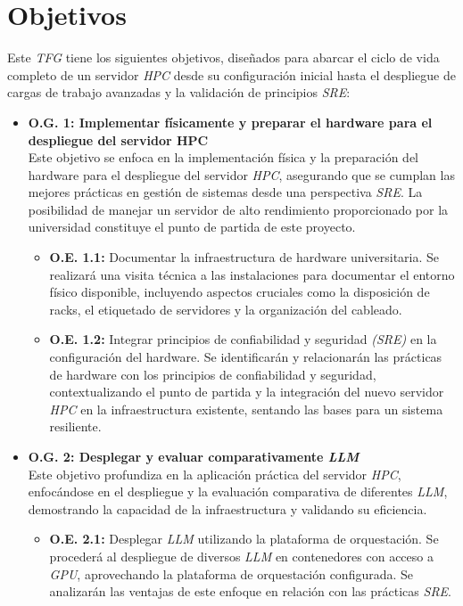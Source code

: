 \section{Objetivos}
Este \textit{TFG} tiene los siguientes objetivos, diseñados para abarcar el ciclo de vida completo de un servidor \textit{HPC} desde su configuración inicial hasta el despliegue de cargas de trabajo avanzadas y la validación de principios \textit{SRE}:

\begin{itemize}
    \item \textbf{O.G. 1: Implementar físicamente y preparar el hardware para el despliegue del servidor HPC}\\
    Este objetivo se enfoca en la implementación física y la preparación del hardware para el despliegue del servidor \textit{HPC}, asegurando que se cumplan las mejores prácticas en gestión de sistemas desde una perspectiva \textit{SRE}. La posibilidad de manejar un servidor de alto rendimiento proporcionado por la universidad constituye el punto de partida de este proyecto.
    \begin{itemize}
        \item \textbf{O.E. 1.1:} Documentar la infraestructura de hardware universitaria. Se realizará una visita técnica a las instalaciones para documentar el entorno físico disponible, incluyendo aspectos cruciales como la disposición de racks, el etiquetado de servidores y la organización del cableado.
        \item \textbf{O.E. 1.2:} Integrar principios de confiabilidad y seguridad \textit{(SRE)} en la configuración del hardware. Se identificarán y relacionarán las prácticas de hardware con los principios de confiabilidad y seguridad, contextualizando el punto de partida y la integración del nuevo servidor \textit{HPC} en la infraestructura existente, sentando las bases para un sistema resiliente.
    \end{itemize}
    \item \textbf{O.G. 2: Desplegar y evaluar comparativamente \textit{LLM}}\\
    Este objetivo profundiza en la aplicación práctica del servidor \textit{HPC}, enfocándose en el despliegue y la evaluación comparativa de diferentes \textit{LLM}, demostrando la capacidad de la infraestructura y validando su eficiencia.
    \begin{itemize}
        \item \textbf{O.E. 2.1:} Desplegar \textit{LLM} utilizando la plataforma de orquestación. Se procederá al despliegue de diversos \textit{LLM} en contenedores con acceso a \textit{GPU}, aprovechando la plataforma de orquestación configurada. Se analizarán las ventajas de este enfoque en relación con las prácticas \textit{SRE}.

\end{itemize}
\end{itemize}
